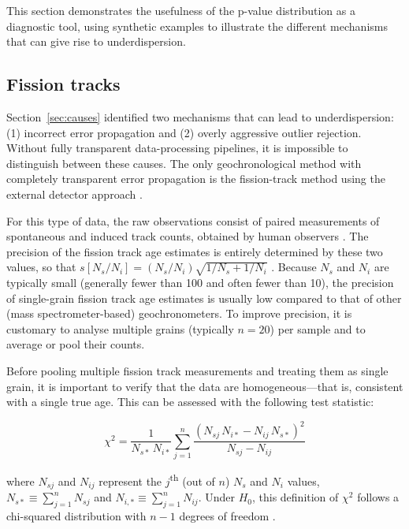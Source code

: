 \documentclass{article}
\begin{document}
This section demonstrates the usefulness of the p-value distribution
as a diagnostic tool, using synthetic examples to illustrate the
different mechanisms that can give rise to underdispersion.

\subsection{Fission tracks}\label{sec:synthetic-FT}

Section~\ref{sec:causes} identified two mechanisms that can lead to
underdispersion: (1) incorrect error propagation and (2) overly
aggressive outlier rejection. Without fully transparent
data-processing pipelines, it is impossible to distinguish between
these causes. The only geochronological method with completely
transparent error propagation is the fission-track method using the
external detector approach \citep{hurford1983}.\medskip

For this type of data, the raw observations consist of paired
measurements of spontaneous and induced track counts, obtained by
human observers \citep[or by computer algorithms trained by human
  observers;][]{nachtergaele2021,boone2025}. The precision of the
fission track age estimates is entirely determined by these two
values, so that $s[N_s/N_i] = (N_s/N_i) \sqrt{1/N_s+1/N_i}$
\citep{galbraith1981}. Because $N_s$ and $N_i$ are typically small
(generally fewer than 100 and often fewer than 10), the precision of
single-grain fission track age estimates is usually low compared to
that of other (mass spectrometer-based) geochronometers. To improve
precision, it is customary to analyse multiple grains (typically
$n=20$) per sample and to average or pool their counts.\medskip

Before pooling multiple fission track measurements and treating them
as single grain, it is important to verify that the data are
homogeneous---that is, consistent with a single true age. This can be
assessed with the following test statistic:

\begin{equation}
  \chi^2 = \dfrac{1}{N_{s\ast}\,N_{i\ast}}
  \sum\limits_{j=1}^{n}\dfrac{\left(N_{sj}\,N_{i\ast}-N_{ij}\,N_{s\ast}\right)^2}
             {N_{sj}-N_{ij}}
\end{equation}

\noindent where $N_{sj}$ and $N_{ij}$ represent the
$j$\textsuperscript{th} (out of $n$) $N_s$ and $N_i$ values,
$N_{s\ast}\equiv\sum_{j=1}^nN_{sj}$ and
$N_{i,\ast}\equiv\sum_{j=1}^nN_{ij}$. Under $H_0$, this definition of
$\chi^2$ follows a chi-squared distribution with $n-1$ degrees of
freedom \citep{galbraith1993}.\medskip
\end{document}
